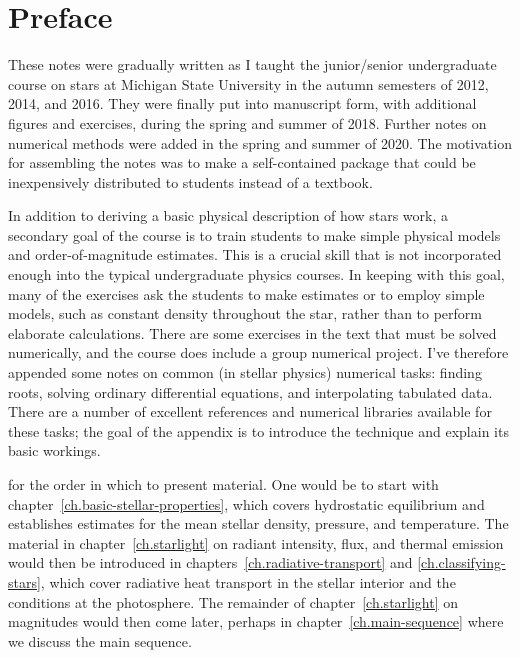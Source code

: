 
\section*{Preface}
These notes were gradually written as I taught the junior/senior undergraduate course on stars at Michigan State University in the autumn semesters of 2012, 2014, and 2016. They were finally put into manuscript form, with additional figures and exercises, during the spring and summer of 2018. Further notes on numerical methods were added in the spring and summer of 2020. The motivation for assembling the notes was to make a self-contained package that could be inexpensively distributed to students instead of a textbook.

In addition to deriving a basic physical description of how stars work, a secondary goal of the course is to train students to make simple physical models and order-of-magnitude estimates. This is a crucial skill that is not incorporated enough into the typical undergraduate physics courses. In keeping with this goal, many of the exercises ask the students to make estimates or to employ simple models, such as constant density throughout the star, rather than to perform elaborate calculations. There are some exercises in the text that must be solved numerically, and the course does include a group numerical project. I've therefore appended some notes on common (in stellar physics) numerical tasks: finding roots, solving ordinary differential equations, and interpolating tabulated data. There are a number of excellent references and numerical libraries available for these tasks; the goal of the appendix is to introduce the technique and explain its basic workings.

 for the order in which to present material. One would be to start with chapter~\ref{ch.basic-stellar-properties}, which covers hydrostatic equilibrium and establishes estimates for the mean stellar density, pressure, and temperature. The material in chapter~\ref{ch.starlight} on radiant intensity, flux, and thermal emission would then be introduced in chapters~\ref{ch.radiative-transport} and \ref{ch.classifying-stars}, which cover radiative heat transport in the stellar interior and the conditions at the photosphere. The remainder of chapter~\ref{ch.starlight} on magnitudes would then come later, perhaps in chapter~\ref{ch.main-sequence} where we discuss the main sequence.

